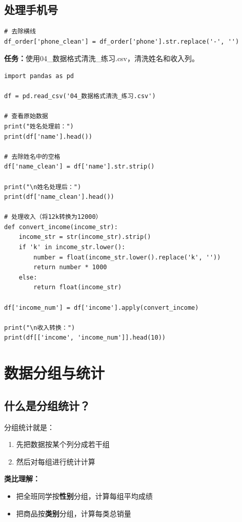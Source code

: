 \documentclass[12pt,a4paper]{article}
\begin{document}
\subsection{处理手机号}

\begin{lstlisting}[caption={标准化手机号}]
# 去除横线
df_order['phone_clean'] = df_order['phone'].str.replace('-', '')
\end{lstlisting}

\begin{practicebox}
\textbf{任务：}使用04\_数据格式清洗\_练习.csv，清洗姓名和收入列。

\begin{lstlisting}
import pandas as pd

df = pd.read_csv('04_数据格式清洗_练习.csv')

# 查看原始数据
print("姓名处理前：")
print(df['name'].head())

# 去除姓名中的空格
df['name_clean'] = df['name'].str.strip()

print("\n姓名处理后：")
print(df['name_clean'].head())

# 处理收入（将12k转换为12000）
def convert_income(income_str):
    income_str = str(income_str).strip()
    if 'k' in income_str.lower():
        number = float(income_str.lower().replace('k', ''))
        return number * 1000
    else:
        return float(income_str)

df['income_num'] = df['income'].apply(convert_income)

print("\n收入转换：")
print(df[['income', 'income_num']].head(10))
\end{lstlisting}
\end{practicebox}

\section{数据分组与统计}

\subsection{什么是分组统计？}

\begin{knowledgebox}[分组统计介绍]
分组统计就是：
\begin{enumerate}
    \item 先把数据按某个列分成若干组
    \item 然后对每组进行统计计算
\end{enumerate}

\textbf{类比理解：}
\begin{itemize}
    \item 把全班同学按\textbf{性别}分组，计算每组平均成绩
    \item 把商品按\textbf{类别}分组，计算每类总销量
\end{itemize}
\end{knowledgebox}
\end{document}
